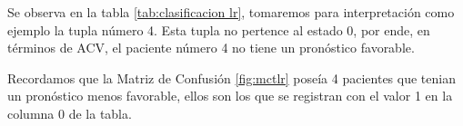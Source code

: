 \begin{table}[H]
\centering
\setlength{\tabcolsep}{10pt}
\caption{Predicciones probabilísticas con clasificación final Logistic Regression}
\label{tab:clasificacion lr}
\end{table}

	Se observa en la tabla \ref{tab:clasificacion lr}, tomaremos para interpretación como ejemplo la tupla número 4. Esta tupla no pertence al estado 0, por ende, en términos de ACV, el paciente número 4 no tiene un pronóstico favorable. 
\par Recordamos que la Matriz de Confusión \ref{fig:mctlr} poseía 4 pacientes que tenian un pronóstico menos favorable, ellos son los que se registran con el valor 1 en la columna 0 de la tabla.\\
